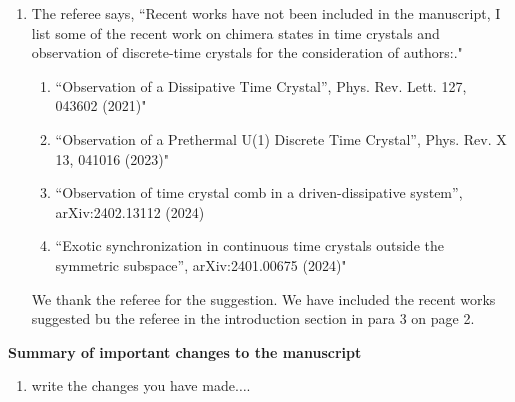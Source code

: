 \documentclass[aps,prb,reprint,showpacs,floatfix,superscriptaddress, onecolumn, nofootinbib, 10pt]{revtex4-2}
\newcommand{\response}[1]{{\color{black}#1}} %
\newcommand{\comment}[1]{{\color{blue}#1}} %
\begin{document}
\begin{enumerate}
\begin{enumerate}
		\item The referee says, \comment{``Recent works have not been included in the manuscript, I list some of the recent work on chimera states in time crystals and observation of discrete-time crystals for the consideration of authors:."}
		\begin{enumerate}
			\item \comment{``Observation of a Dissipative Time Crystal”, Phys. Rev. Lett. 127, 043602 (2021)"}
			\item \comment{``Observation of a Prethermal U(1) Discrete Time Crystal”, Phys. Rev. X 13, 041016 (2023)"}
			\item \comment{``Observation of time crystal comb in a driven-dissipative system”, arXiv:2402.13112 (2024)}
			\item \comment{``Exotic synchronization in continuous time crystals outside the symmetric subspace”, arXiv:2401.00675 (2024)"}\\
		\end{enumerate}
		
		\response{
		We thank the referee for the suggestion. We have included the recent works suggested bu the referee in the introduction section in para 3 on page 2. 
		}\\
	\end{enumerate}
\end{enumerate}
		
		

	
	
\noindent \textbf{Summary of important changes to the  manuscript}
\begin{enumerate}
	\item write the changes you have made$\dots$.
\end{enumerate}
\end{document}
